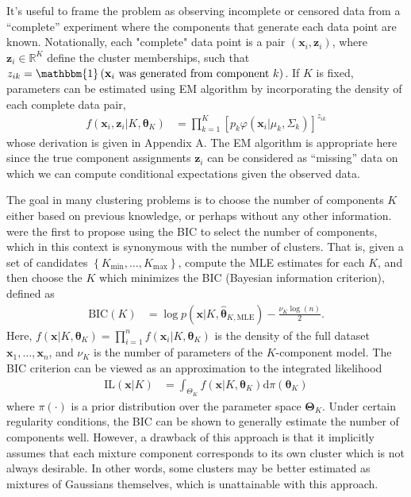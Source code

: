 \documentclass{uwstat572}
\newcommand*\reals{\mathbb{R}}
\newcommand*\ba{\[ \begin{aligned}}
\newcommand*\ea{\end{aligned} \]}
\newcommand*\ind[1]{\mathbbm{1}\left(#1\right)}
\newcommand*\set[1]{\left\{#1\right\}}
\newcommand*\estim[1]{\widehat{#1}}
\newcommand*\der{\text{d}}
\newcommand*\bx{\mathbf{x}}
\newcommand*\bz{\mathbf{z}}
\newcommand*\btheta{\boldsymbol{\theta}}
\newcommand*\bTheta{\boldsymbol{\Theta}}
\renewcommand\;{\,}
\renewcommand\phi{\varphi}
\begin{document}
It's useful to frame the problem as observing incomplete or censored data from a ``complete'' experiment where the components that generate each data point are known. Notationally, each "complete" data point is a pair $(\bx_i, \bz_i)$, where 
$\bz_i \in \reals^K$ define the cluster memberships, such that $z_{ik} = \ind{\bx_i \text{ was generated from component $k$}}$.  
If $K$ is fixed, parameters can be estimated using EM algorithm by incorporating the density of each complete data pair,
\ba
f(\bx_i, \bz_i | K, \btheta_K)
	& = \prod_{k=1}^K \left[ p_k \phi(\bx_i | \mu_k, \Sigma_k) \right]^{z_{ik}}
\ea
whose derivation is given in Appendix A.
The EM algorithm is appropriate here since the true component assignments $\bz_i$ can be considered as ``missing'' data on which we can compute conditional expectations given the observed data.


The goal in many clustering problems is to choose the number of components $K$ either based on previous knowledge, or perhaps without any other information.
\citet{Dasgupta98} were the first to propose using the BIC to select the number of components, which in this context is synonymous with the number of clusters. 
That is, given a set of candidates $\set{K_\text{min}, \dotsc, K_\text{max}}$, compute the MLE estimates for each $K$, and then choose the $K$ which minimizes the BIC (Bayesian information criterion), defined as
\ba
\text{BIC}(K) 
	& = \log p(\bx | K, \estim\btheta_{K, \text{MLE}})
		- \frac{ \nu_K \log(n) }{2}.
\ea
Here,
$f(\bx | K, \btheta_K) = \prod_{i = 1}^n f(\bx_i | K, \btheta_K)$ is the density of the full dataset $\bx_1, \dotsc, \bx_n$, and
 $\nu_K$ is the number of parameters of the $K$-component model.
The BIC criterion can be viewed as an approximation to the integrated likelihood
\ba
\text{IL}(\bx | K)
	& = \int_{\Theta_K} f(\bx | K, \btheta_K) \der \pi(\btheta_K)
\ea
where $\pi(\cdot)$ is a prior distribution over the parameter space $\bTheta_K$.
Under certain regularity conditions, the BIC can be shown to generally estimate the number of components well.
However, a drawback of this approach is that it implicitly assumes that each mixture component corresponds to its own cluster which is not always desirable.
In other words, some clusters may be better estimated as mixtures of Gaussians themselves, which is unattainable with this approach. 
\end{document}

